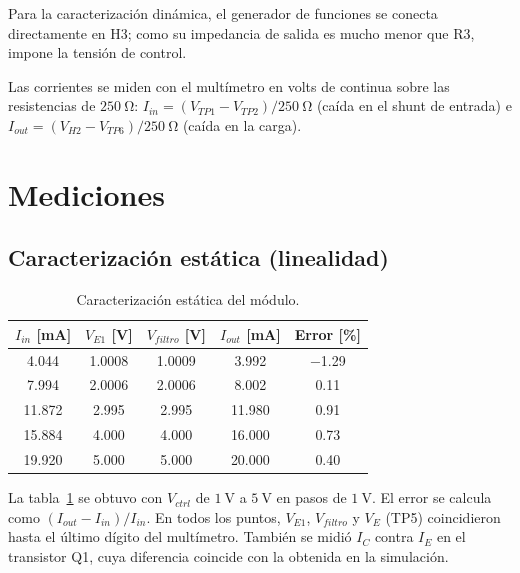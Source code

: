 Para la caracterización dinámica, el generador de funciones se conecta directamente en H3; como su impedancia de
salida es mucho menor que R3, impone la tensión de control.

Las corrientes se miden con el multímetro en volts de continua sobre las resistencias de $\SI{250}{\ohm}$:
$I_{in} = (V_{TP1} - V_{TP2}) / \SI{250}{\ohm}$ (caída en el shunt de entrada) e
$I_{out} = (V_{H2} - V_{TP6}) / \SI{250}{\ohm}$ (caída en la carga).

\section{Mediciones}
\label{sec:campo-mediciones}

\subsection{Caracterización estática (linealidad)}
\label{subsec:campo-estatica}

\begin{table}[!ht]
  \centering
  \begin{tabular}{|c|c|c|c|c|}
    \hline
    $I_{in}$ [\si{\milli\ampere}] & $V_{E1}$ [\si{\volt}] & $V_{filtro}$ [\si{\volt}] & $I_{out}$ [\si{\milli\ampere}]
      & Error [\si{\percent}] \\
    \hline
    \num{4.044}  & \num{1.0008} & \num{1.0009} & \num{3.992}  & \num{-1.29} \\
    \num{7.994}  & \num{2.0006} & \num{2.0006} & \num{8.002}  & \num{0.11} \\
    \num{11.872} & \num{2.995}  & \num{2.995}  & \num{11.980} & \num{0.91} \\
    \num{15.884} & \num{4.000}  & \num{4.000}  & \num{16.000} & \num{0.73} \\
    \num{19.920} & \num{5.000}  & \num{5.000}  & \num{20.000} & \num{0.40} \\
    \hline
  \end{tabular}
  \caption{Caracterización estática del módulo.}
  \label{tab:campo-estatica}
\end{table}

La tabla~\ref{tab:campo-estatica} se obtuvo con $V_{ctrl}$ de $\SI{1}{\volt}$ a $\SI{5}{\volt}$ en pasos de
$\SI{1}{\volt}$. El error se calcula como $(I_{out} - I_{in}) / I_{in}$. En todos los puntos, $V_{E1}$, $V_{filtro}$
y $V_E$ (TP5) coincidieron hasta el último dígito del multímetro. También se midió $I_C$ contra $I_E$ en el
transistor Q1, cuya diferencia coincide con la obtenida en la simulación.

